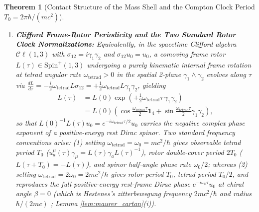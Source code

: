 \documentclass[11pt, a4paper]{article}
\newtheorem{theorem}{Theorem}[section]
\theoremstyle{definition}
\begin{document}
\begin{theorem}[Contact Structure of the Mass Shell and the Compton Clock Period $T_0 = 2\pi\hbar / (mc^2)$]
\begin{enumerate}[label=(\roman*)]
    \begin{equation}
    \label{eq:phase_Phi}
    \Phi(x^\mu) = \frac{S(x^\mu)}{\hbar} = -\frac{mc^2}{\hbar}\tau_{\text{clock}}(x^\mu) \pmod{2\pi}.
    \end{equation}
    \item \textbf{Clifford Frame-Rotor Periodicity and the Two Standard Rotor Clock Normalizations:} Equivalently, in the spacetime Clifford algebra $\mathcal{C}\ell(1,3)$ with $\sigma_{12} = i\gamma_1\gamma_2$ and $\sigma_{12}u_0 = u_0$, a comoving frame rotor $L(\tau) \in \text{Spin}^+(1,3)$ undergoing a purely kinematic internal frame rotation at tetrad angular rate $\omega_{\text{tetrad}} > 0$ in the spatial 2-plane $\gamma_1 \wedge \gamma_2$ evolves along $\tau$ via $\frac{dL}{d\tau} = -\frac{i}{2}\omega_{\text{tetrad}} L \sigma_{12} = +\frac{1}{2}\omega_{\text{tetrad}} L \gamma_1\gamma_2$, yielding
    \begin{equation}
    \label{eq:rotor_compton_evolution}
    \begin{aligned}
    L(\tau) &= L(0) \exp\left( +\frac{1}{2}\omega_{\text{tetrad}}\tau\,\gamma_1\gamma_2 \right) \\
    &= L(0)\left( \cos\frac{\omega_{\text{tetrad}}\tau}{2}\mathbf{1}_4 + \sin\frac{\omega_{\text{tetrad}}\tau}{2}\gamma_1\gamma_2 \right),
    \end{aligned}
    \end{equation}
    so that $L(0)^{-1}L(\tau)u_0 = e^{-i\omega_{\text{tetrad}}\tau/2}u_0$ carries the negative complex phase exponent of a positive-energy rest Dirac spinor. Two standard frequency conventions arise: (1) setting $\omega_{\text{tetrad}} = \omega_0 = mc^2/\hbar$ gives observable tetrad period $T_0$ ($u_a^\mu(\tau)\gamma_\mu = L(\tau)\gamma_a L(\tau)^{-1}$), rotor double-cover period $2T_0$ ($L(\tau + T_0) = -L(\tau)$), and spinor half-angle phase rate $\omega_0 / 2$; whereas (2) setting $\omega_{\text{tetrad}} = 2\omega_0 = 2mc^2/\hbar$ gives rotor period $T_0$, tetrad period $T_0 / 2$, and reproduces the full positive-energy rest-frame Dirac phase $e^{-i\omega_0 \tau}u_0$ at chiral angle $\beta = 0$ (which is Hestenes's \textit{zitterbewegung} frequency $2mc^2/\hbar$ and radius $\hbar/(2mc)$ \cite{Hestenes1990}; Lemma \ref{lem:maurer_cartan}(i)).
\end{enumerate}
\end{theorem}
\end{document}
